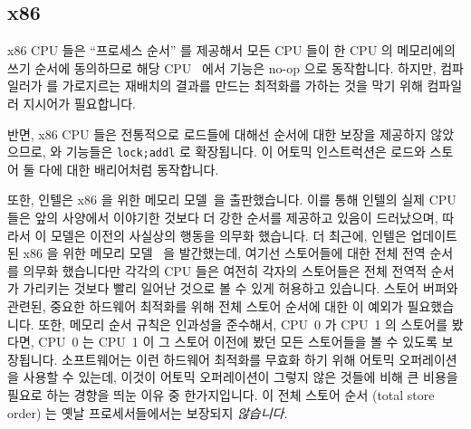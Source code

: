 \subsection{x86}

x86 CPU 들은 ``프로세스 순서'' 를 제공해서 모든 CPU 들이 한 CPU 의 메모리에의
쓰기 순서에 동의하므로 해당 CPU~\cite{IntelXeonV3-96a} 에서 
기능은 no-op 으로 동작합니다.
하지만, 컴파일러가  를 가로지르는 재배치의 결과를 만드는
최적화를 가하는 것을 막기 위해 컴파일러 지시어가 필요합니다.

반면, x86 CPU 들은 전통적으로 로드들에 대해선 순서에 대한 보장을 제공하지
않았으므로,  와  기능들은 {\tt lock;addl} 로
확장됩니다.
이 어토믹 인스트럭션은 로드와 스토어 둘 다에 대한 배리어처럼 동작합니다.

또한, 인텔은 x86 을 위한 메모리 모델~\cite{Intelx86MemoryOrdering2007}을
출판했습니다.
이를 통해 인텔의 실제 CPU 들은 앞의 사양에서 이야기한 것보다 더 강한 순서를
제공하고 있음이 드러났으며, 따라서 이 모델은 이전의 사실상의 행동을 의무화
했습니다.
더 최근에, 인텔은 업데이트된 x86 을 위한 메모리
모델~\cite[Section8.2]{Intel64IA32v3A2011} 을 발간했는데, 여기선 스토어들에
대한 전체 전역 순서를 의무화 했습니다만 각각의 CPU 들은 여전히 각자의
스토어들은 전체 전역적 순서가 가리키는 것보다 빨리 일어난 것으로 볼 수 있게
허용하고 있습니다.
스토어 버퍼와 관련된, 중요한 하드웨어 최적화를 위해 전체 스토어 순서에 대한 이
예외가 필요했습니다.
또한, 메모리 순서 규칙은 인과성을 준수해서, CPU~0 가 CPU~1 의 스토어를 봤다면,
CPU~0 는 CPU~1 이 그 스토어 이전에 봤던 모든 스토어들을 볼 수 있도록
보장됩니다.
소프트웨어는 이런 하드웨어 최적화를 무효화 하기 위해 어토믹 오퍼레이션을 사용할
수 있는데, 이것이 어토믹 오퍼레이션이 그렇지 않은 것들에 비해 큰 비용을 필요로
하는 경향을 띄눈 이유 중 한가지입니다.
이 전체 스토어 순서 (total store order) 는 옛날 프로세서들에서는 보장되지
\emph{않습니다}.
\iffalse

